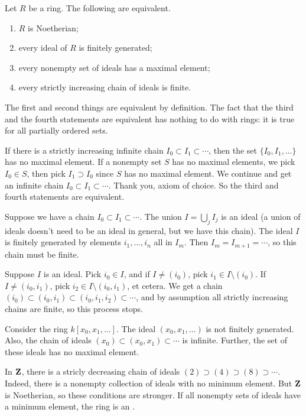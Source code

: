 \documentclass[11pt, oneside,margin=1in]{article}
\begin{document}
Let $R$ be a ring. The following are equivalent.
\begin{enumerate}
	\item $R$ is Noetherian;
	\item every ideal of $R$ is finitely generated;
	\item every nonempty set of ideals has a maximal element;
	\item every strictly increasing chain of ideals is finite.
\end{enumerate}
The first and second things are equivalent by definition. The fact that the third and the fourth statements are equivalent has nothing to do with rings: it is true for all partially ordered sets. 

If there is a strictly increasing infinite chain $I_0\subset I_1 \subset \cdots$, then the set $\{I_0, I_1,\hdots\}$ has no maximal element. If a nonempty set $S$ has no maximal elements, we pick $I_0\in S$, then pick $I_1\supset I_0$ since $S$ has no maximal element. We continue and get an infinite chain $I_0\subset I_1 \subset \cdots$. Thank you, axiom of choice. So the third and fourth statements are equivalent.

Suppose we have a chain $I_0\subset I_1 \subset \cdots$. The union $I = \bigcup_j I_j$ is an ideal (a union of ideals doesn't need to be an ideal in general, but we have this chain). The ideal $I$ is finitely generated by elements $i_1,\hdots, i_n$ all in $I_m$. Then $I_m = I_{m+1} = \cdots$, so this chain must be finite.

Suppose $I$ is an ideal. Pick $i_0\in I$, and if $I \ne (i_0)$, pick $i_1 \in I\setminus (i_0)$. If $I\ne (i_0,i_1)$, pick $i_2 \in I \setminus (i_0,i_1)$, et cetera. We get a chain $(i_0)\subset  (i_0, i_1)\subset  (i_0,i_1,i_2) \subset \cdots$, and by assumption all strictly increasing chains are finite, so this process stops.

\begin{example}\label{}
Consider the ring $k[x_0,x_1,\hdots]$. The ideal $(x_0,x_1,\hdots)$ is not finitely generated. Also, the chain of ideals $(x_0) \subset (x_0,x_1) \subset\cdots$ is infinite. Further, the set of these ideals has no maximal element.
\end{example}

\begin{example}\label{}
In $\mathbf Z$, there is a stricly decreasing chain of ideals $(2)\supset  (4) \supset(8) \supset\cdots$. Indeed, there is a nonempty collection of ideals with no minimum element. But $\mathbf Z$ is Noetherian, so these conditions are stronger. If all nonempty sets of ideals have a minimum element, the ring is an .
\end{example}
\end{document}

